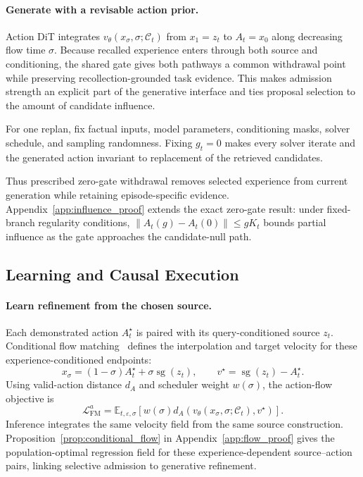 \paragraph{Generate with a revisable action prior.}
Action DiT integrates $v_\theta(x_\sigma,\sigma;\mathcal C_t)$ from $x_1=z_t$ to $A_t=x_0$ along decreasing flow time $\sigma$.
Because recalled experience enters through both source and conditioning, the shared gate gives both pathways a common withdrawal point while preserving recollection-grounded task evidence.
This makes admission strength an explicit part of the generative interface and ties proposal selection to the amount of candidate influence.

\begin{warmproposition}
\label{prop:withdrawal}
For one replan, fix factual inputs, model parameters, conditioning masks, solver schedule, and sampling randomness.
Fixing $g_t=0$ makes every solver iterate and the generated action invariant to replacement of the retrieved candidates.
\end{warmproposition}
Thus prescribed zero-gate withdrawal removes selected experience from current generation while retaining episode-specific evidence.
Appendix~\ref{app:influence_proof} extends the exact zero-gate result: under fixed-branch regularity conditions, $\|A_t(g)-A_t(0)\|\leq gK_t$ bounds partial influence as the gate approaches the candidate-null path.

\subsection{Learning and Causal Execution}
\label{sec:learning}

\paragraph{Learn refinement from the chosen source.}
Each demonstrated action $A_t^\star$ is paired with its query-conditioned source $z_t$.
Conditional flow matching~\citep{lipman2023flowmatching,liu2023rectifiedflow} defines the interpolation and target velocity for these experience-conditioned endpoints:
\begin{equation}
 x_\sigma=(1-\sigma)A_t^\star+\sigma\operatorname{sg}(z_t),\qquad
 v^\star=\operatorname{sg}(z_t)-A_t^\star.
 \label{eq:flow}
\end{equation}
Using valid-action distance $d_A$ and scheduler weight $w(\sigma)$, the action-flow objective is
\begin{equation}
 \mathcal L_{\mathrm{FM}}^a=\mathbb E_{t,\varepsilon,\sigma}
 \left[w(\sigma)d_A\!\left(v_\theta(x_\sigma,\sigma;\mathcal C_t),v^\star\right)\right].
 \label{eq:action_fm}
\end{equation}
Inference integrates the same velocity field from the same source construction.
Proposition~\ref{prop:conditional_flow} in Appendix~\ref{app:flow_proof} gives the population-optimal regression field for these experience-dependent source--action pairs, linking selective admission to generative refinement.

